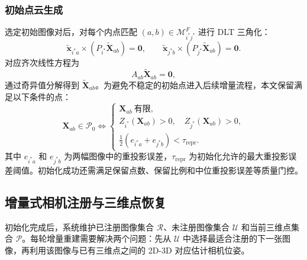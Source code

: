 \documentclass[lang=cn,a4paper,newtx]{elegantpaper} %
\begin{document}
\subsubsection{初始点云生成}
选定初始图像对后，对每个内点匹配 $(a,b)\in\mathcal{M}_{i^{*}j^{*}}^{F}$ 进行 DLT 三角化：
\begin{equation}
    \tilde{\mathbf{x}}_{i^{*}a}\times(P_{i^{*}}\tilde{\mathbf{X}}_{ab})=\mathbf{0},
    \qquad
    \tilde{\mathbf{x}}_{j^{*}b}\times(P_{j^{*}}\tilde{\mathbf{X}}_{ab})=\mathbf{0}.
\end{equation}
对应齐次线性方程为
\begin{equation}
    A_{ab}\tilde{\mathbf{X}}_{ab}=\mathbf{0},
\end{equation}
通过奇异值分解得到 $\tilde{\mathbf{X}}_{ab}$。为避免不稳定的初始点进入后续增量流程，本文保留满足以下条件的点：
\begin{equation}
    \mathbf{X}_{ab}\in\mathcal{P}_{0}
    \Longleftrightarrow
    \begin{cases}
    \mathbf{X}_{ab}\ \text{有限},\\
    Z_{i^{*}}(\mathbf{X}_{ab})>0,\quad Z_{j^{*}}(\mathbf{X}_{ab})>0,\\
    \frac{1}{2}\left(e_{i^{*}a}+e_{j^{*}b}\right)<\tau_{\mathrm{repr}}.
    \end{cases}
\end{equation}
其中 $e_{i^{*}a}$ 和 $e_{j^{*}b}$ 为两幅图像中的重投影误差，$\tau_{\mathrm{repr}}$ 为初始化允许的最大重投影误差阈值。初始化成功还需满足保留点数、保留比例和中位重投影误差等质量门控。

\subsection{增量式相机注册与三维点恢复}
初始化完成后，系统维护已注册图像集合 $\mathcal{R}$、未注册图像集合 $\mathcal{U}$ 和当前三维点集合 $\mathcal{P}$。每轮增量重建需要解决两个问题：先从 $\mathcal{U}$ 中选择最适合注册的下一张图像，再利用该图像与已有三维点之间的 2D-3D 对应估计相机位姿。
\end{document}
